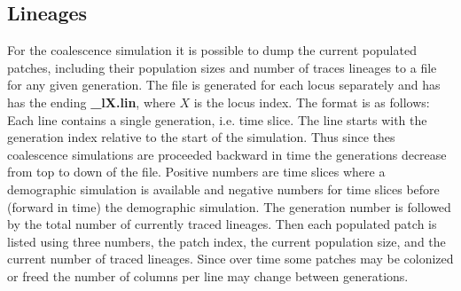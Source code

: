 \documentclass[letterpaper,12pt,oneside]{book}
\begin{document}
\subsection{Lineages}\label{coalLineages}
For the coalescence simulation it is possible to dump the current populated patches, including their population sizes and number of traces lineages to a file for any given generation. The file is generated for each locus separately and has has the ending \textbf{\_lX.lin}, where $X$ is the locus index. The format is as follows: Each line contains a single generation, i.e. time slice. The line starts with the generation index relative to the start of the simulation. Thus since thes coalescence simulations are proceeded backward in time the generations decrease from top to down of the file. Positive numbers are time slices where a demographic simulation is available and negative numbers for time slices before (forward in time) the demographic simulation. The generation number is followed by the total number of currently traced lineages. Then each populated patch is listed using three numbers, the patch index, the current population size, and the current number of traced lineages. Since over time some patches may be colonized or freed the number of columns per line may change between generations.
\end{document}

